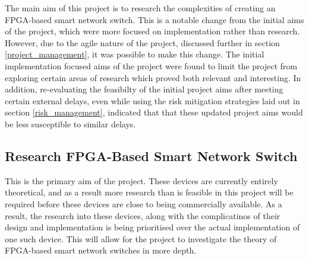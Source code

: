 











The main aim of this project is to research the complexities of creating an FPGA-based smart network switch. This is a notable change from the initial aims of the project, which were more focused on implementation rather than research. However, due to the agile nature of the project, discussed further in section \ref{project_management}, it was possible to make this change.
The initial implementation focused aims of the project were found to limit the project from exploring certain areas of research which proved both relevant and interesting. In addition, re-evaluating the feasibilty of the initial project aims after meeting certain external delays, even while using the risk mitigation strategies laid out in section \ref{risk_management}, indicated that that these updated project aims would be less susceptible to similar delays.

\subsection{Research FPGA-Based Smart Network Switch}
This is the primary aim of the project. These devices are currently entirely theoretical, and as a result more research than is feasible in this project will be required before these devices are close to being commercially available. As a result, the research into these devices, along with the complicatinos of their design and implementation is being prioritised over the actual implementation of one such device. This will allow for the project to investigate the theory of FPGA-based smart network switches in more depth.

